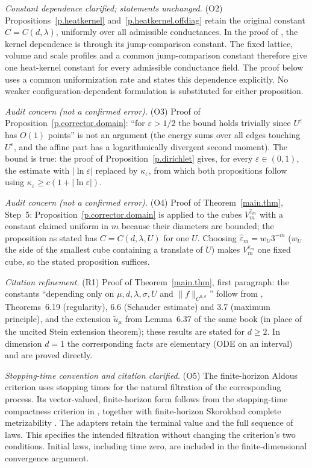 \documentclass[11pt]{amsart}
\theoremstyle{plain}
\theoremstyle{definition}
\theoremstyle{remark}
\newcommand{\eps}{\varepsilon}
\begin{document}
\noindent\emph{Constant dependence clarified; statements unchanged.} (O2)
Propositions~\ref{p.heatkernel} and~\ref{p.heatkernel.offdiag} retain the original
constant $C=C(d,\lambda)$, uniformly over all admissible conductances.
In the proof of \cite[Theorem~1.1]{MuruganSaloffCoste2015}, the kernel dependence
is through its jump-comparison constant. The fixed lattice, volume and scale
profiles and a common jump-comparison constant therefore give one heat-kernel
constant for every admissible conductance field. The proof below uses a common
uniformization rate and states this dependence explicitly. No weaker
configuration-dependent formulation is substituted for either proposition.

\noindent\emph{Audit concern (not a confirmed error).} (O3) Proof of
Proposition~\ref{p.corrector.domain}: ``for $\eps > 1/2$ the bound holds trivially since $U^\eps$ has
$O(1)$ points'' is not an argument (the energy sums over all edges touching $U^\eps$, and the affine
part has a logarithmically divergent second moment). The bound is true: the proof of
Proposition~\ref{p.dirichlet} gives, for every $\eps \in (0,1)$, the estimate with $|\ln\eps|$ replaced
by $\kappa_\eps$, from which both propositions follow using $\kappa_\eps \ge c(1+|\ln\eps|)$.

\noindent\emph{Audit concern (not a confirmed error).} (O4) Proof of Theorem~\ref{main.thm}, Step~5:
Proposition~\ref{p.corrector.domain} is applied to the cubes $V_m^{\widehat\eps_m}$ with a constant
claimed uniform in $m$ because their diameters are bounded; the proposition as stated has
$C = C(d,\lambda,U)$ for one $U$. Choosing $\widehat\eps_m = w_U 3^{-m}$ ($w_U$ the side of the smallest
cube containing a translate of $U$) makes $V_m^{\widehat\eps_m}$ one fixed cube, so the stated
proposition suffices.

\noindent\emph{Citation refinement.} (R1) Proof of Theorem~\ref{main.thm}, first paragraph: the
constants ``depending only on $\mu, d, \lambda, \sigma, U$ and $\|f\|_{C^{0,\sigma}}$'' follow from
\cite{GilbargTrudinger2001}, Theorems~6.19 (regularity), 6.6 (Schauder estimate) and 3.7 (maximum
principle), and the extension $\widetilde u_\mu$ from Lemma~6.37 of the same book (in place of the
uncited Stein extension theorem); these results are stated for $d \ge 2$. In dimension $d = 1$ the
corresponding facts are elementary (ODE on an interval) and are proved directly.

\noindent\emph{Stopping-time convention and citation clarified.} (O5)
The finite-horizon Aldous criterion uses stopping times for the natural
filtration of the corresponding process. Its vector-valued, finite-horizon form
follows from the stopping-time compactness criterion in
\cite[Chapter~3, Theorem~8.6(c) and Remark~8.7(b)]{EthierKurtz1986}, together with
finite-horizon Skorokhod complete metrizability
\cite[Theorems~12.1 and 12.2]{Billingsley1999}. The adapters retain the terminal
value and the full sequence of laws. This specifies the intended filtration
without changing the criterion's two conditions. Initial laws, including time
zero, are included in the finite-dimensional convergence argument.
\end{document}

